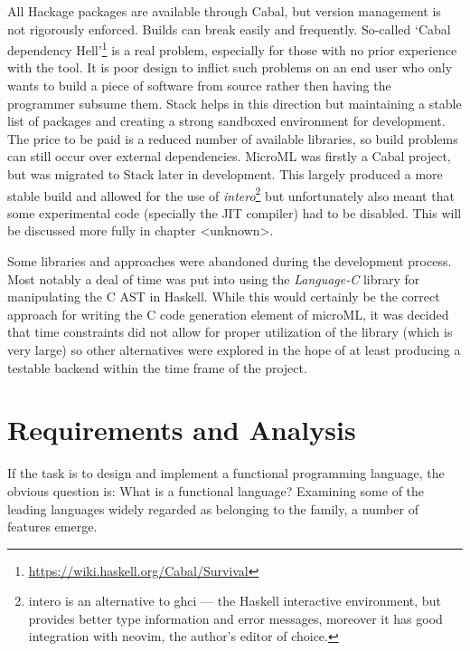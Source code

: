 \documentclass[12pt, a4paper]{report}
\begin{document}
All Hackage packages are available through Cabal, but version management is not rigorously
enforced. Builds can break easily and frequently. So-called `Cabal dependency
Hell'\footnote{\url{https://wiki.haskell.org/Cabal/Survival}} is a real problem, especially for
those with no prior experience with the tool. It is poor design to inflict such problems on an end
user who only wants to build a piece of software from source rather then having the programmer
subsume them. Stack helps in this direction but maintaining a stable list of packages and creating a
strong sandboxed environment for development. The price to be paid is a reduced number of available
libraries, so build problems can still occur over external dependencies. MicroML was firstly a Cabal
project, but was migrated to Stack later in development. This largely produced a more stable
build and allowed for the use of \textit{intero}\footnote{intero is an alternative to ghci --- the
    Haskell interactive environment, but provides better type information and error messages,
    moreover it has good integration with neovim, the author's editor of choice.} but unfortunately also meant that some experimental
code (specially the JIT compiler) had to be disabled. This will be discussed more fully in chapter
<unknown>.

Some libraries and approaches were abandoned during the development process. Most notably a deal of
time was put into using the \textit{Language-C} library for manipulating the C AST in Haskell. While
this would certainly be the correct approach for writing the C code generation element of microML,
it was decided that time constraints did not allow for proper utilization of the library (which is
very large) so other alternatives were explored in the hope of at least producing a testable backend
within the time frame of the project. 

\chapter{Requirements and Analysis}

If the task is to design and implement a functional programming language, the obvious question is: What is a functional language? 
Examining some of the leading languages widely regarded as belonging to the family, a number of
features emerge.
\end{document}
